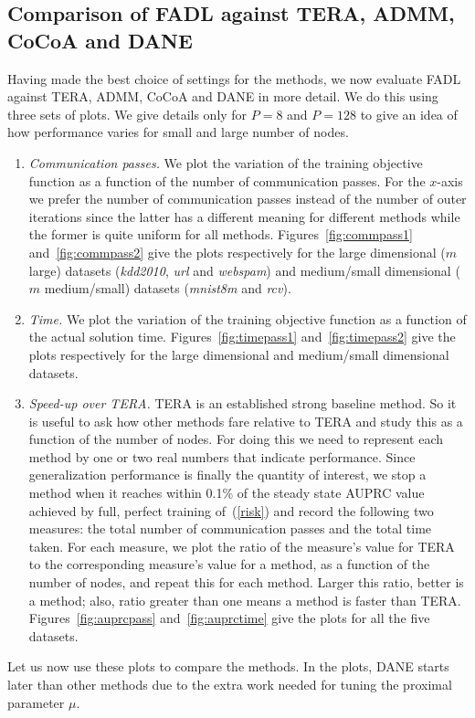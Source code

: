 \documentclass[twoside, 11pt]{article}
\begin{document}
\subsection{Comparison of FADL against TERA, ADMM, CoCoA and DANE}
\label{subsec:overallcomp}

Having made the best choice of settings for the methods, we now evaluate FADL against TERA, ADMM, CoCoA and DANE in more detail. We do this using three sets of plots. We give details only for $P=8$ and $P=128$ to give an idea of how performance varies for small and large number of nodes.
\begin{enumerate}
\item {\it Communication passes.} We plot the variation of the training objective function as a function of the number of communication passes. For the $x$-axis we prefer the number of communication passes instead of the number of outer iterations since the latter has a different meaning for different methods while the former is quite uniform for all methods. Figures~\ref{fig:commpass1} and~\ref{fig:commpass2} give the plots respectively for the large dimensional ($m$ large) datasets ({\it kdd2010}, {\it url} and {\it webspam}) and medium/small dimensional ($m$ medium/small) datasets ({\it mnist8m} and {\it rcv}).
\item {\it Time.} We plot the variation of the training objective function as a function of the actual solution time. Figures~\ref{fig:timepass1} and~\ref{fig:timepass2} give the plots respectively for the large dimensional and medium/small dimensional datasets.
\item {\it Speed-up over TERA.} TERA is an established strong baseline method. So it is useful to ask how other methods fare relative to TERA and study this as a function of the number of nodes. For doing this we need to represent each method by one or two real numbers that indicate performance. Since generalization performance is finally the quantity of interest, we stop a method when it reaches within 0.1\% of the steady state AUPRC value achieved by full, perfect training of~(\ref{risk}) and record the following two measures: the total number of communication passes and the total time taken. For each measure, we plot the ratio of the measure's value for TERA to the corresponding measure's value for a method, as a function of the number of nodes, and repeat this for each method. Larger this ratio, better is a method; also, ratio greater than one means a method is faster than TERA. Figures~\ref{fig:auprcpass} and~\ref{fig:auprctime} give the plots for all the five datasets.
\end{enumerate}
Let us now use these plots to compare the methods. In the plots, DANE starts later than other methods due to the extra work needed for tuning the proximal parameter $\mu$.
\end{document}
